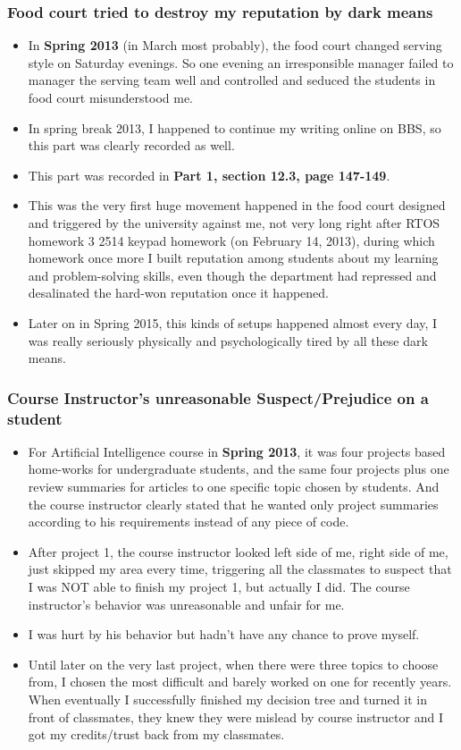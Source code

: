\documentclass[9pt,b5paper]{article}
\begin{document}
\subsubsection{Food court tried to destroy my reputation by dark means}
\label{sec-12-3-3}
\begin{itemize}
\item In \textbf{Spring 2013} (in March most probably), the food court changed serving style on Saturday evenings. So one evening an irresponsible manager failed to manager the serving team well and controlled and seduced the students in food court misunderstood me.
\item In spring break 2013, I happened to continue my writing online on BBS, so this part was clearly recorded as well.
\item This part was recorded in \textbf{Part 1, section 12.3, page 147-149}.
\item This was the very first huge movement happened in the food court designed and triggered by the university against me, not very long right after RTOS homework 3 2514 keypad homework (on February 14, 2013), during which homework once more I built reputation among students about my learning and problem-solving skills, even though the department had repressed and desalinated the hard-won reputation once it happened.
\item Later on in Spring 2015, this kinds of setups happened almost every day, I was really seriously physically and psychologically tired by all these dark means.
\end{itemize}
\subsubsection{Course Instructor's unreasonable Suspect/Prejudice on a student}
\label{sec-12-3-4}
\begin{itemize}
\item For Artificial Intelligence course in \textbf{Spring 2013}, it was four projects based home-works for undergraduate students, and the same four projects plus one review summaries for articles to one specific topic chosen by students. And the course instructor clearly stated that he wanted only project summaries according to his requirements instead of any piece of code.
\item After project 1, the course instructor looked left side of me, right side of me, just skipped my area every time, triggering all the classmates to suspect that I was NOT able to finish my project 1, but actually I did. The course instructor's behavior was unreasonable and unfair for me.
\item I was hurt by his behavior but hadn't have any chance to prove myself.
\item Until later on the very last project, when there were three topics to choose from, I chosen the most difficult and barely worked on one for recently years. When eventually I successfully finished my decision tree and turned it in front of classmates, they knew they were mislead by course instructor and I got my credits/trust back from my classmates.
\end{itemize}
\end{document}
